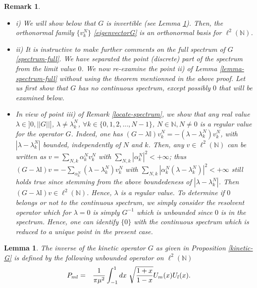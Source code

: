\documentclass[a4paper,11pt,twoside]{article}
\numberwithin{equation}{section}
\newcommand\bbone{{ \mathbb{I}}}
\newtheorem{lemma}[Theorem]{Lemma}
\newtheorem{remark}[Theorem]{Remark}
\theoremstyle{nonumberplain}
\begin{document}
\begin{remark} \ \\[-20pt]
\begin{itemize}
\setlength{\itemsep}{-1pt}
\item i) We will show below that $G$ is invertible (see Lemma \ref{propagator-spectform}). Then, the orthonormal family $\{v^N_k \}$ \eqref{eigenvectorG} is an orthonormal basis for $\ell^2(\mathbb{N})$.
\item ii) It is instructive to make further comments on the full spectrum of $G$ \eqref{spectrum-full}. We have separated the point (discrete) part of the spectrum from the limit value $0$. We now re-examine the point ii) of Lemma \ref{lemma-spectrum-full} without using the theorem mentionned in the above proof. Let us first show that $G$ has no continuous spectrum, except possibly $0$ that will be examined below.
\item In view of point iii) of Remark \ref{locate-spectrum}, we show that any real value $\lambda\in]0,||G||]$, $\lambda\ne\lambda^N_k$, $\forall k\in\{0,1,2,...,N-1 \}$, $N\in\mathbb{N}, N\ne0$ is a regular value for the operator $G$. Indeed, one has $(G-\lambda\bbone)v^N_k=-(\lambda-\lambda^N_k)v^N_k$, with $|\lambda-\lambda^N_k|$ bounded, independently of $N$ and $k$. Then, any $v\in\ell^2(\mathbb{N})$ can be written as $v=\sum_{N,k}\alpha^N_kv^N_k$ with $\sum_{N,k}|\alpha^N_k|^2<+\infty$; thus $(G-\lambda\bbone)v=-\sum_{\alpha^N_k}(\lambda-\lambda^N_k)v^N_k$ with $\sum_{N,k}|\alpha^N_k(\lambda-\lambda^N_k)
|^2<+\infty$ still holds true since stemming from the above boundedeness of $|\lambda-\lambda^N_k|$. Then $(G-\lambda\bbone)v\in\ell^2(\mathbb{N})$. Hence, $\lambda$ is a regular value. To determine if $0$ belongs or not to the continuous spectrum, we simply consider the resolvent operator which for $\lambda=0$ is simply $G^{-1}$ which is unbounded since $0$ is in the spectrum. Hence, one can identify $\{0\}$ with the continuous spectrum which is reduced to a unique point in the present case.
\end{itemize}
\end{remark}
\begin{lemma}\label{propagator-spectform}
The inverse of the kinetic operator $G$ as given in Proposition \ref{kinetic-G} is defined by the following unbounded operator on $\ell^2(\mathbb{N})$
\begin{eqnarray}
P_{ml}&=&{{1}\over{\pi\mu^2}}\int_{-1}^1dx\ {\sqrt{{{1+x }\over{ 1-x}}}}U_m(x)U_l(x)\label{invers-G}.
\end{eqnarray}
\end{lemma}
\end{document}
